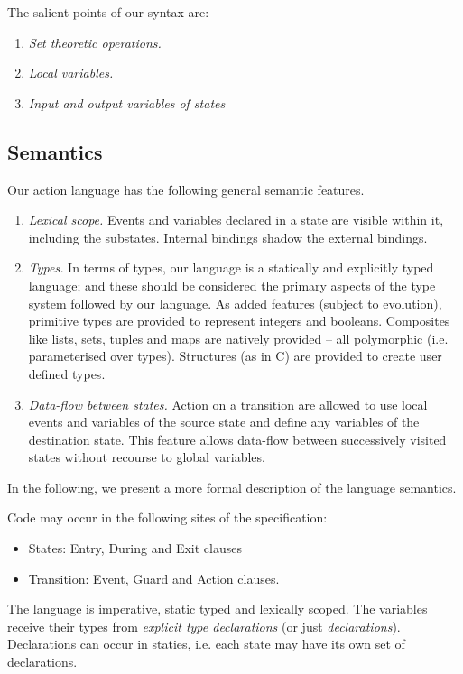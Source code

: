 \documentclass[12pt,a4paper]{report}
\begin{document}
The salient points of our syntax are:
\begin{enumerate}
	\item \emph{Set theoretic operations.}
	\item \emph{Local variables.}
	\item \emph{Input and output variables of states}
\end{enumerate}


\subsection{Semantics}
Our action language has the following general semantic features.
\begin{enumerate}
	\item \emph{Lexical scope.} Events and variables declared in a state are visible within it, including the substates. Internal bindings shadow the external bindings.
	\item \emph{Types.} In terms of types, our language is a statically and explicitly typed language; and these should be considered the primary aspects of the type system followed by our language. As added features (subject to evolution), primitive types are provided to represent integers and booleans. Composites like lists, sets, tuples and maps are natively provided -- all polymorphic (i.e. parameterised over types). Structures (as in C) are provided to create user defined types.  
	\item \emph{Data-flow between states.} Action on a transition are allowed to use local events and variables of the source state and define any variables of the destination state. This feature allows data-flow between successively visited states without recourse to global variables.
\end{enumerate}

In the following, we present a more formal description of the language semantics.

Code may occur in the following sites of the specification:
\begin{itemize}
	\item States: Entry, During and Exit clauses
	\item Transition: Event, Guard and Action clauses.
\end{itemize}

The language is imperative, static typed and lexically scoped. The variables receive their types from \emph{explicit type declarations} (or just \emph{declarations}). Declarations can occur in staties, i.e. each state may have its own set of declarations.
\end{document}
